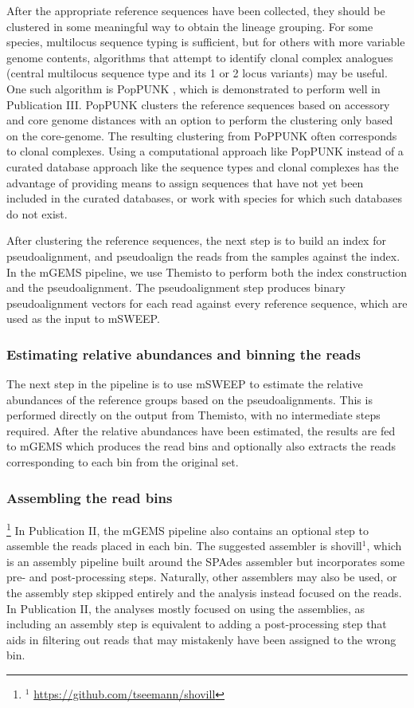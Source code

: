 \documentclass[officiallayout]{tktla}
\begin{document}
After the appropriate reference sequences have been collected, they
should be clustered in some meaningful way to obtain the lineage
grouping. For some species, multilocus sequence typing is sufficient,
but for others with more variable genome contents, algorithms that
attempt to identify clonal complex analogues (central multilocus
sequence type and its 1 or 2 locus variants) may be useful. One such
algorithm is PopPUNK \citep{lees2019fast}, which is demonstrated to
perform well in Publication III. PopPUNK clusters the
reference sequences based on accessory and core genome distances with
an option to perform the clustering only based on the core-genome. The
resulting clustering from PoPPUNK often corresponds to clonal
complexes. Using a computational approach like PopPUNK instead of a curated
database approach like the sequence types and clonal complexes has the
advantage of providing means to assign sequences that have not yet
been included in the curated databases, or work with species for which
such databases do not exist.

After clustering the reference sequences, the next step is to build an
index for pseudoalignment, and pseudoalign the reads from the samples
against the index. In the mGEMS pipeline, we use Themisto
\citep{maklin_bacterial_2021} to perform both the index construction
and the pseudoalignment. The pseudoalignment step produces binary
pseudoalignment vectors for each read against every reference
sequence, which are used as the input to mSWEEP.

\subsubsection{Estimating relative abundances and binning the reads}

The next step in the pipeline is to use mSWEEP to estimate the
relative abundances of the reference groups based on the
pseudoalignments. This is performed directly on the output from
Themisto, with no intermediate steps required. After the relative
abundances have been estimated, the results are fed to mGEMS which
produces the read bins and optionally also extracts the reads
corresponding to each bin from the original set.

\subsubsection{Assembling the read bins}

\noindent\let\thefootnote\relax\footnote{$^{1}$ \url{https://github.com/tseemann/shovill}}
In Publication II, the mGEMS pipeline also contains an optional step
to assemble the reads placed in each bin. The suggested assembler is
shovill$^{1}$, which is an assembly pipeline built around the SPAdes
assembler \citep{prjibelski2020using} but incorporates some pre- and
post-processing steps. Naturally, other assemblers may also be used,
or the assembly step skipped entirely and the analysis instead focused
on the reads. In Publication II, the analyses mostly focused on using
the assemblies, as including an assembly step is equivalent to adding
a post-processing step that aids in filtering out reads that may
mistakenly have been assigned to the wrong bin.
\end{document}
